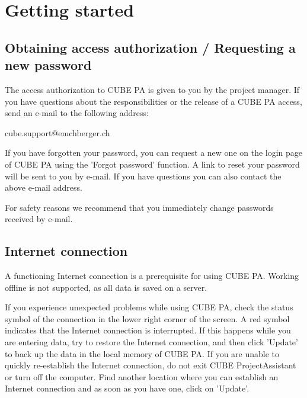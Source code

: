 

\section{Getting started}
\subsection{Obtaining access authorization / Requesting a new password}


The access authorization to CUBE PA is given to you by the project manager. If you have questions about the responsibilities or the release of a CUBE PA access, send an e-mail to the following address:

\vspace{\baselineskip}

{\color{red} cube.support@emchberger.ch}

\vspace{\baselineskip}

If you have forgotten your password, you can request a new one on the login page of CUBE PA using the 'Forgot password' function. A link to reset your password will be sent to you by e-mail. If you have questions you can also contact the above e-mail address.

\vspace{\baselineskip}

For safety reasons we recommend that you immediately change passwords received by e-mail.

\subsection{Internet connection}

A functioning Internet connection is a prerequisite for using CUBE PA. Working offline is not supported, as all data is saved on a server.

\vspace{\baselineskip}

If you experience unexpected problems while using CUBE PA, check the status symbol of the connection in the lower right corner of the screen. A red symbol indicates that the Internet connection is interrupted. If this happens while you are entering data, try to restore the Internet connection, and then click 'Update' to back up the data in the local memory of CUBE PA. If you are unable to quickly re-establish the Internet connection, do not exit CUBE ProjectAssistant or turn off the computer. Find another location where you can establish an Internet connection and as soon as you have one, click on 'Update'.

